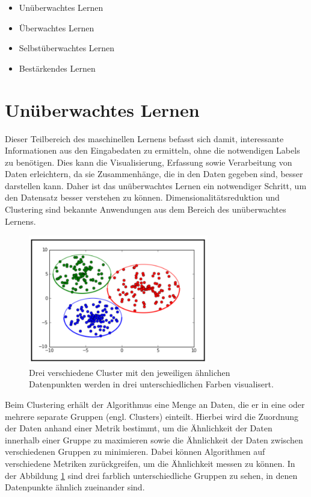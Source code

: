 \begin{itemize}
	\item Unüberwachtes Lernen
	\item Überwachtes Lernen
	\item Selbstüberwachtes Lernen
	\item Bestärkendes Lernen
\end{itemize}

\section{Unüberwachtes Lernen}

Dieser Teilbereich des maschinellen Lernens befasst sich damit, interessante Informationen aus den Eingabedaten zu ermitteln, ohne die notwendigen Labels zu benötigen. Dies kann die Visualisierung, Erfassung sowie Verarbeitung von Daten erleichtern, da sie Zusammenhänge, die in den Daten gegeben sind, besser darstellen kann. Daher ist das unüberwachtes Lernen ein notwendiger Schritt, um den Datensatz besser verstehen zu können. Dimensionalitätsreduktion und Clustering sind bekannte Anwendungen aus dem Bereich des unüberwachtes Lernens\cite{francois}.

\begin{figure}[h!]
	\centering
	\includegraphics[width=0.7\textwidth]{bilder/cluster.PNG}
	\caption{Drei verschiedene Cluster mit den jeweiligen ähnlichen Datenpunkten werden in drei unterschiedlichen Farben visualisert\cite{Vasilev2019}.}
	\label{cluster}
\end{figure}


Beim Clustering erhält der Algorithmus eine Menge an Daten, die er in eine oder mehrere separate Gruppen (engl. Clusters) einteilt. Hierbei wird die Zuordnung der Daten anhand einer Metrik bestimmt, um die Ähnlichkeit der Daten innerhalb einer Gruppe zu maximieren sowie die Ähnlichkeit der Daten zwischen verschiedenen Gruppen zu minimieren. Dabei können Algorithmen auf verschiedene Metriken zurückgreifen, um die Ähnlichkeit messen zu können\cite{Vasilev2019}. In der Abbildung \ref{cluster} sind drei farblich unterschiedliche Gruppen zu sehen, in denen Datenpunkte ähnlich zueinander sind.




